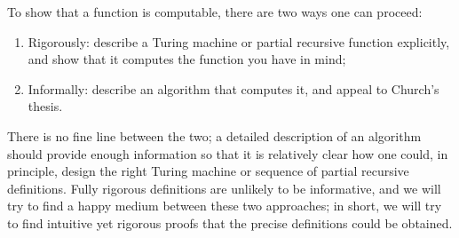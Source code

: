 \documentclass[../../include/open-logic-section]{subfiles}
\begin{document}
To show that a function is computable, there are
two ways one can proceed:
\begin{enumerate}
\item Rigorously: describe a Turing machine or partial recursive
  function explicitly, and show that it computes the function you have
  in mind;
\item Informally: describe an algorithm that computes it, and appeal to
  Church's thesis.
\end{enumerate}
There is no fine line between the two; a detailed description of
an algorithm should provide enough information so that it is
relatively clear how one could, in principle, design the right Turing
machine or sequence of partial recursive definitions. Fully rigorous
definitions are unlikely to be informative, and we will try to find a
happy medium between these two approaches; in short, we will try to
find intuitive yet rigorous proofs that the precise definitions could
be obtained.
\end{document}
